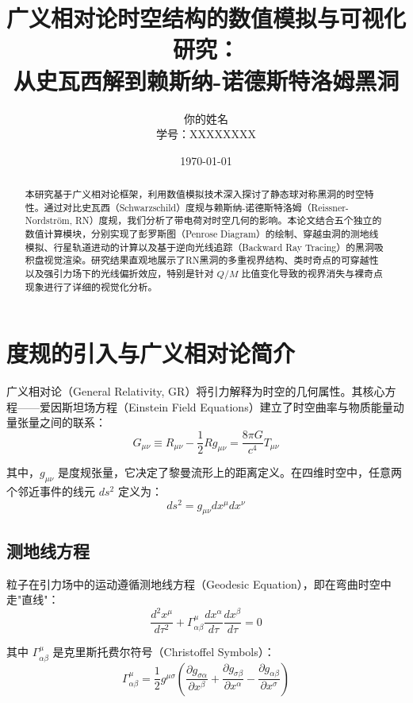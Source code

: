 \documentclass[a4paper,12pt]{article}
\title{\textbf{广义相对论时空结构的数值模拟与可视化研究：}\\从史瓦西解到赖斯纳-诺德斯特洛姆黑洞}
\author{你的姓名 \\ 学号：XXXXXXXX}
\date{\today}
\begin{document}
\maketitle

\begin{abstract}
本研究基于广义相对论框架，利用数值模拟技术深入探讨了静态球对称黑洞的时空特性。通过对比史瓦西（Schwarzschild）度规与赖斯纳-诺德斯特洛姆（Reissner-Nordström, RN）度规，我们分析了带电荷对时空几何的影响。本论文结合五个独立的数值计算模块，分别实现了彭罗斯图（Penrose Diagram）的绘制、穿越虫洞的测地线模拟、行星轨道进动的计算以及基于逆向光线追踪（Backward Ray Tracing）的黑洞吸积盘视觉渲染。研究结果直观地展示了RN黑洞的多重视界结构、类时奇点的可穿越性以及强引力场下的光线偏折效应，特别是针对 $Q/M$ 比值变化导致的视界消失与裸奇点现象进行了详细的视觉化分析。
\end{abstract}

\newpage
\tableofcontents
\newpage

\section{度规的引入与广义相对论简介}

广义相对论（General Relativity, GR）将引力解释为时空的几何属性。其核心方程——爱因斯坦场方程（Einstein Field Equations）建立了时空曲率与物质能量动量张量之间的联系：
\begin{equation}
    G_{\mu\nu} \equiv R_{\mu\nu} - \frac{1}{2}R g_{\mu\nu} = \frac{8\pi G}{c^4} T_{\mu\nu}
\end{equation}

其中，$g_{\mu\nu}$ 是度规张量，它决定了黎曼流形上的距离定义。在四维时空中，任意两个邻近事件的线元 $ds^2$ 定义为：
\begin{equation}
    ds^2 = g_{\mu\nu} dx^\mu dx^\nu
\end{equation}

\subsection{测地线方程}

粒子在引力场中的运动遵循测地线方程（Geodesic Equation），即在弯曲时空中走"直线"：
\begin{equation}
    \frac{d^2 x^\mu}{d\tau^2} + \Gamma^\mu_{\alpha\beta} \frac{dx^\alpha}{d\tau} \frac{dx^\beta}{d\tau} = 0
\end{equation}

其中 $\Gamma^\mu_{\alpha\beta}$ 是克里斯托费尔符号（Christoffel Symbols）：
\begin{equation}
    \Gamma^\mu_{\alpha\beta} = \frac{1}{2}g^{\mu\sigma}\left(\frac{\partial g_{\sigma\alpha}}{\partial x^\beta} + \frac{\partial g_{\sigma\beta}}{\partial x^\alpha} - \frac{\partial g_{\alpha\beta}}{\partial x^\sigma}\right)
\end{equation}
\end{document}
